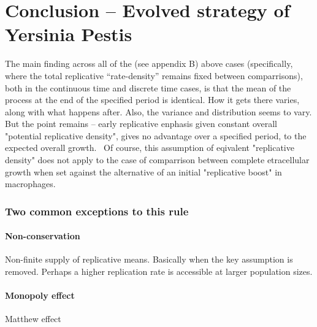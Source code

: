 



\chapter{Conclusion -- Evolved strategy of Yersinia Pestis}












The main finding across all of the (see appendix B) above cases (specifically, where the total replicative ``rate-density'' remains fixed between comparrisons), both in the continuous time and discrete time cases, is that the mean of the process at the end of the specified period is identical.  How it gets there varies, along with what happens after. Also, the variance and distribution seems to vary.  But the point remains -- early replicative enphasis given constant overall "potential replicative density", gives no advantage over a specified period, to the expected overall growth. \ 
Of course, this assumption of eqivalent "replicative density" does not apply to the case of comparrison between complete etracellular growth when set against the alternative of an initial "replicative boost" in macrophages. 











\subsection*{Two common exceptions to this rule}

\subsubsection{Non-conservation}
Non-finite supply of replicative means. Basically when the key assumption is removed. Perhaps a higher replication rate is accessible at larger population sizes.



\subsubsection{Monopoly effect}
Matthew effect






